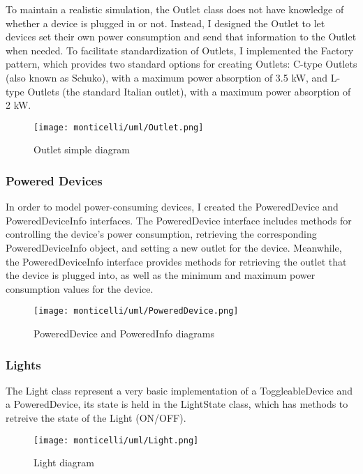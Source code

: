 To maintain a realistic simulation, the Outlet class does not have knowledge of whether a device is plugged in or not. 
Instead, I designed the Outlet to let devices set their own power consumption and send that information to the Outlet when needed. 
To facilitate standardization of Outlets, I implemented the Factory pattern, which provides two standard options for creating Outlets:
C-type Outlets (also known as Schuko), with a maximum power absorption of 3.5 kW, and L-type Outlets (the standard Italian outlet),
with a maximum power absorption of 2 kW.
\begin{figure}[H]
    \centering{}
    \texttt{[image: monticelli/uml/Outlet.png]}
    \caption{Outlet simple diagram}
    \label{monticelli:uml:outlet}
\end{figure}
\subsubsection*{Powered Devices}
In order to model power-consuming devices, I created the PoweredDevice and PoweredDeviceInfo interfaces.\newline
The PoweredDevice interface includes methods for controlling the device's power consumption, retrieving the corresponding PoweredDeviceInfo object, 
and setting a new outlet for the device. Meanwhile, the PoweredDeviceInfo interface provides methods for retrieving the outlet that the device is plugged into, 
as well as the minimum and maximum power consumption values for the device.

\begin{figure}[H]
    \centering{}
    \texttt{[image: monticelli/uml/PoweredDevice.png]}
    \caption{PoweredDevice and PoweredInfo diagrams}
    \label{monticelli:uml:poweredDevice}
\end{figure}
\subsubsection*{Lights}
The Light class represent a very basic implementation of a ToggleableDevice and a PoweredDevice, its state is held in the LightState class, which has methods to retreive the state of the Light (ON/OFF).

\begin{figure}[H]
    \centering{}
    \texttt{[image: monticelli/uml/Light.png]}
    \caption{Light diagram}
    \label{monticelli:uml:light}
\end{figure}
